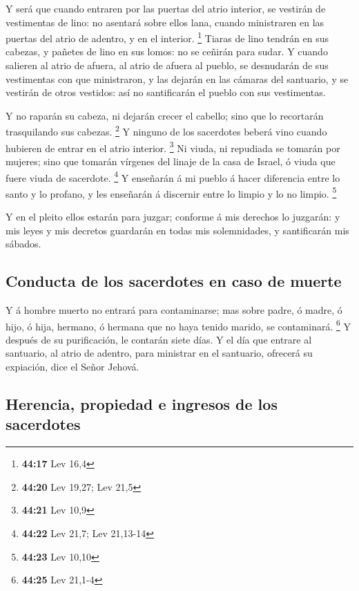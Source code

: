  Y será que cuando entraren por las puertas del atrio
interior, se vestirán de vestimentas de lino: no asentará sobre ellos
lana, cuando ministraren en las puertas del atrio de adentro, y en el
interior. \footnote{\textbf{44:17} Lev 16,4}  Tiaras de
lino tendrán en sus cabezas, y pañetes de lino en sus lomos: no se
ceñirán para sudar.  Y cuando salieren al atrio de
afuera, al atrio de afuera al pueblo, se desnudarán de sus vestimentas
con que ministraron, y las dejarán en las cámaras del santuario, y se
vestirán de otros vestidos: así no santificarán el pueblo con sus
vestimentas.

 Y no raparán su cabeza, ni dejarán crecer el cabello;
sino que lo recortarán trasquilando sus cabezas. \footnote{\textbf{44:20}
  Lev 19,27; Lev 21,5}  Y ninguno de los sacerdotes
beberá vino cuando hubieren de entrar en el atrio interior. \footnote{\textbf{44:21}
  Lev 10,9}  Ni viuda, ni repudiada se tomarán por
mujeres; sino que tomarán vírgenes del linaje de la casa de Israel, ó
viuda que fuere viuda de sacerdote. \footnote{\textbf{44:22} Lev 21,7;
  Lev 21,13-14}  Y enseñarán á mi pueblo á hacer
diferencia entre lo santo y lo profano, y les enseñarán á discernir
entre lo limpio y lo no limpio. \footnote{\textbf{44:23} Lev 10,10}

 Y en el pleito ellos estarán para juzgar; conforme á mis
derechos lo juzgarán: y mis leyes y mis decretos guardarán en todas mis
solemnidades, y santificarán mis sábados.

\hypertarget{conducta-de-los-sacerdotes-en-caso-de-muerte}{%
\subsection{Conducta de los sacerdotes en caso de
muerte}\label{conducta-de-los-sacerdotes-en-caso-de-muerte}}

 Y á hombre muerto no entrará para contaminarse; mas
sobre padre, ó madre, ó hijo, ó hija, hermano, ó hermana que no haya
tenido marido, se contaminará. \footnote{\textbf{44:25} Lev 21,1-4}
 Y después de su purificación, le contarán siete días.
 Y el día que entrare al santuario, al atrio de adentro,
para ministrar en el santuario, ofrecerá su expiación, dice el Señor
Jehová.

\hypertarget{herencia-propiedad-e-ingresos-de-los-sacerdotes}{%
\subsection{Herencia, propiedad e ingresos de los
sacerdotes}\label{herencia-propiedad-e-ingresos-de-los-sacerdotes}}


